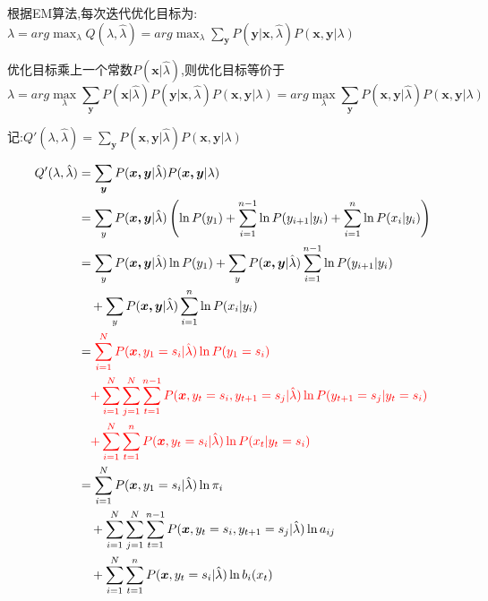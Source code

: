 \documentclass[UTF8,a4paper]{ctexart}%
\begin{document}
            根据EM算法,每次迭代优化目标为:
            $\lambda = arg \max_{\lambda} Q(\lambda , \hat{\lambda}) = arg \max_{\lambda} \sum_{\bm{y}} P(\bm{y}|\bm{x},\hat{\lambda})P(\bm{x,y}|\lambda)$

            优化目标乘上一个常数$P(\bm{x}|\hat{\lambda})$,则优化目标等价于
              \[ \lambda = arg \max_{\lambda} \sum_{\bm{y}} P(\bm{x}|\hat{\lambda})P(\bm{y}|\bm{x},\hat{\lambda})P(\bm{x,y}|\lambda) = arg \max_{\lambda} \sum_{\bm{y}} P(\bm{x,y}|\hat{\lambda})P(\bm{x,y}|\lambda) \]

            记:$Q'(\lambda,\hat{\lambda}) = \sum_{\bm{y}} P(\bm{x,y}|\hat{\lambda})P(\bm{x,y}|\lambda)$

            \begin{align}
              Q'(\lambda,\hat{\lambda}) &= \sum_{\bm{y}} P(\bm{x,y}|\hat{\lambda})P(\bm{x,y}|\lambda)\\
                &= \sum_{y} P(\bm{x,y}|\hat{\lambda}) \left( \ln P(y_1) + \sum_{i = 1}^{n-1} \ln P(y_{i+1}|y_{i}) + \sum_{i = 1}^n \ln P(x_i|y_i) \right )\\
                &= \sum_{y} P(\bm{x,y}|\hat{\lambda}) \ln P(y_1)
                  + \sum_{y} P(\bm{x,y}|\hat{\lambda})  \sum_{i = 1}^{n-1} \ln P(y_{i+1}|y_{i})\\
                  &\quad + \sum_{y} P(\bm{x,y}|\hat{\lambda}) \sum_{i = 1}^n \ln P(x_i|y_i) \notag \\
                &= {\color{red}
                \sum_{i = 1}^N  P(\bm{x},y_1 = s_i|\hat{\lambda}) \ln P(y_1 = s_i)}\\
                  &\quad{\color{red}
                  + \sum_{i = 1}^N \sum_{j = 1}^N \sum_{t = 1}^{n-1}
                       P(\bm{x},y_t = s_i , y_{t+1} = s_j|\hat{\lambda}) \ln P(y_{t+1} = s_j|y_{t} = s_i)} \notag \\
                  &\quad{\color{red}
                   + \sum_{i = 1}^N \sum_{t = 1}^n P(\bm{x},y_t = s_i|\hat{\lambda}) \ln P(x_t|y_t = s_i)} \notag \\
                &= \sum_{i = 1}^N  P(\bm{x},y_1 = s_i|\hat{\lambda}) \ln \pi_i\\
                  &\quad+ \sum_{i = 1}^N \sum_{j = 1}^N \sum_{t = 1}^{n-1}
                      P(\bm{x},y_t = s_i , y_{t+1} = s_j|\hat{\lambda}) \ln a_{ij} \notag\\
                  &\quad + \sum_{i = 1}^N \sum_{t = 1}^n P(\bm{x},y_t = s_i|\hat{\lambda}) \ln b_i(x_t) \notag
            \end{align}
\end{document}

